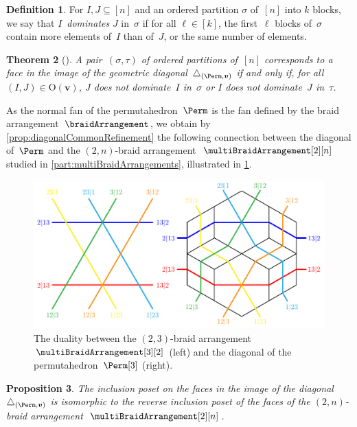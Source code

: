 \documentclass{amsart}
\newcommand{\darkblue}{\color{darkblue}} %
\newtheorem{theorem}{Theorem}[section]
\newtheorem{proposition}[theorem]{Proposition}
\theoremstyle{definition}
\newtheorem{definition}[theorem]{Definition}
\renewcommand{\b}[1]{{\boldsymbol{#1}}} %
\newcommand{\Or}{\mathrm{O}} %
\newcommand{\defn}[1]{\textsl{\darkblue #1}} %
\renewcommand{\b}[1]{\boldsymbol{#1}} %
\begin{document}
\begin{definition}
	\label{def:domination}
For $I,J \subseteq [n]$ and an ordered partition $\sigma$ of~$[n]$ into $k$ blocks, we say that $I$~\defn{dominates} $J$ in~$\sigma$ if for all $\ell \in [k]$, the first~$\ell$ blocks of~$\sigma$ contain more elements of~$I$ than of~$J$, or the same number of elements.
\end{definition}

\begin{theorem}[{\cite[Thm.~3.16]{LaplanteAnfossi}}]
\label{thm:IJ-description}
A pair~$(\sigma, \tau)$ of ordered partitions of~$[n]$ corresponds to a face in the image of the geometric diagonal~$\triangle_{(\Perm, \b{v})}$ if and only if, for all~$(I,J) \in \Or(\b{v})$, $J$ does not dominate~$I$ in~$\sigma$ or $I$ does not dominate~$J$ in~$\tau$.
\end{theorem}

As the normal fan of the permutahedron~$\Perm$ is the fan defined by the braid arrangement~$\braidArrangement$, we obtain by \cref{prop:diagonalCommonRefinement} the following connection between the diagonal of~$\Perm$ and the $(2,n)$-braid arrangement~$\multiBraidArrangement[2][n]$ studied in \cref{part:multiBraidArrangements}, illustrated in \cref{fig:diagonalPermutahedron1}.
%
\begin{figure}
	\centerline{\includegraphics[scale=.9]{diagonalPermutahedron1}}
	\caption{The duality between the $(2,3)$-braid arrangement~$\multiBraidArrangement[3][2]$ (left) and the diagonal of the permutahedron~$\Perm[3]$ (right).}
	\label{fig:diagonalPermutahedron1}
\end{figure}

\begin{proposition}
\label{prop:diagonalPermutahedraMultiBraidArrangements}
The inclusion poset on the faces in the image of the diagonal~$\triangle_{(\Perm, \b{v})}$ is isomorphic to the reverse inclusion poset of the faces of the $(2,n)$-braid arrangement~$\multiBraidArrangement[2][n]$. 
\end{proposition}
\end{document}
